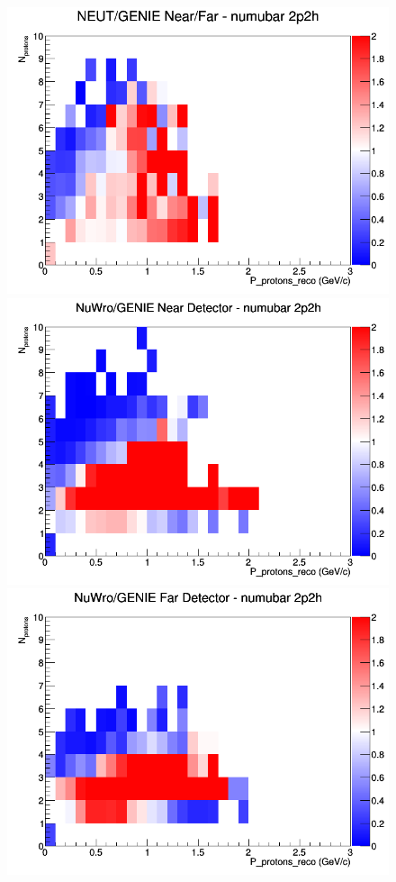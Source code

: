 \begin{figure}[h]
\endminipage
{}
\includegraphics[width=\linewidth]{eff_N_P/GAr/protons/ratios/2p2h_NEUT_GENIE_numubar_NF_N_P.png}
\endminipage
\newline
{}
\includegraphics[width=\linewidth]{eff_N_P/GAr/protons/ratios/2p2h_NuWro_GENIE_numubar_near_N_P.png}
\endminipage
{}
\includegraphics[width=\linewidth]{eff_N_P/GAr/protons/ratios/2p2h_NuWro_GENIE_numubar_far_N_P.png}

\end{figure}
